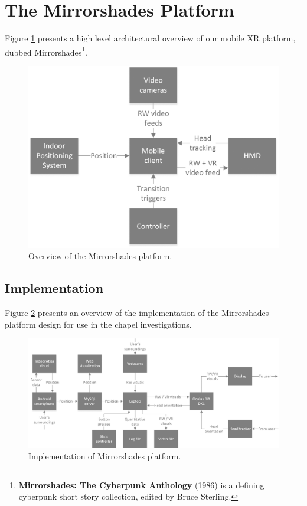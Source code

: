 \clearpage


\section{The Mirrorshades Platform}
Figure \ref{systemarchitecture} presents a high level architectural overview of our mobile XR platform, dubbed Mirrorshades\footnote{\textbf{Mirrorshades: The Cyberpunk Anthology} (1986) is a defining cyberpunk short story collection, edited by Bruce Sterling.}.

\begin{figure}[h]
	\thispagestyle{empty}
	\begin{center}
		\includegraphics[width=.5\linewidth]{images/system-architecture.png}
		\caption{Overview of the Mirrorshades platform.}
		\label{systemarchitecture}
	\end{center}
\end{figure}


\subsection{Implementation}
Figure \ref{experimentalimplementation} presents an overview of the implementation of the Mirrorshades platform design for use in the chapel investigations.

\begin{figure}[h]
	\thispagestyle{empty}
	\begin{center}
		\includegraphics[width=.925\linewidth]{images/experimental-implementation.png}
		\caption{Implementation of Mirrorshades platform.}
		\label{experimentalimplementation}
	\end{center}
\end{figure}

